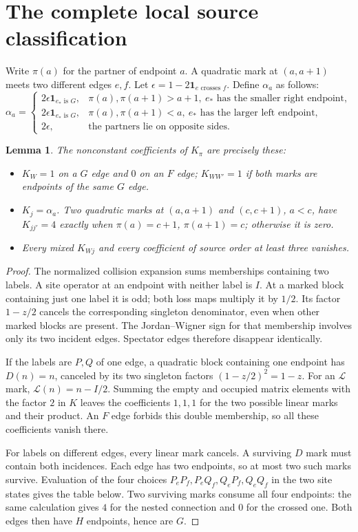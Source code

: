 \documentclass[11pt]{article}
\newcommand{\one}{\mathbf 1}
\newtheorem{lemma}{Lemma}
\begin{document}
\section{The complete local source classification}
Write $\pi(a)$ for the partner of endpoint $a$. A quadratic mark at
$(a,a+1)$ meets two different edges $e,f$. Let
$\epsilon=1-2\one_{e\text{ crosses }f}$. Define $\alpha_a$ as follows:
\begin{equation}\label{alpha}
 \alpha_a=\begin{cases}
 2\epsilon\one_{e_*\text{ is }G},&\pi(a),\pi(a+1)>a+1,
     \ e_*\text{ has the smaller right endpoint},\\
 2\epsilon\one_{e_*\text{ is }G},&\pi(a),\pi(a+1)<a,
     \ e_*\text{ has the larger left endpoint},\\
 2\epsilon,&\text{the partners lie on opposite sides.}
 \end{cases}
\end{equation}
\begin{lemma}\label{local}
The nonconstant coefficients of $K_\pi$ are precisely these:
\begin{itemize}
\item $K_W=1$ on a $G$ edge and $0$ on an $F$ edge;
$K_{WW'}=1$ if both marks are endpoints of the same $G$ edge.
\item $K_j=\alpha_a$. Two quadratic marks at $(a,a+1)$ and $(c,c+1)$,
$a<c$, have $K_{jj'}=4$ exactly when
$\pi(a)=c+1$, $\pi(a+1)=c$; otherwise it is zero.
\item Every mixed $K_{Wj}$ and every coefficient of source order at
least three vanishes.
\end{itemize}
\end{lemma}
\begin{proof}
The normalized collision expansion sums memberships containing two
labels. A site operator at an endpoint with neither label is $I$.
At a marked block containing just one label it is odd; both loss maps
multiply it by $1/2$. Its factor $1-z/2$ cancels the corresponding
singleton denominator, even when other marked blocks are present.
The Jordan--Wigner sign for that membership involves only its two
incident edges. Spectator edges therefore disappear identically.

If the labels are $P,Q$ of one edge, a quadratic block containing
one endpoint has $D(n)=n$, canceled by its two singleton factors
$(1-z/2)^2=1-z$. For an $\mathcal L$ mark,
$\mathcal L(n)=n-I/2$. Summing the empty and occupied matrix elements
with the factor $2$ in $K$ leaves the coefficients $1,1,1$ for the
two possible linear marks and their product. An $F$ edge forbids
this double membership, so all these coefficients vanish there.

For labels on different edges, every linear mark cancels. A surviving
$D$ mark must contain both incidences. Each edge has two endpoints,
so at most two such marks survive. Evaluation of the four choices
$P_eP_f,P_eQ_f,Q_eP_f,Q_eQ_f$ in the two site states gives the table
below. Two surviving marks consume all four endpoints: the same
calculation gives $4$ for the nested connection and $0$ for the crossed
one. Both edges then have $H$ endpoints, hence are $G$.
\end{proof}
\end{document}
